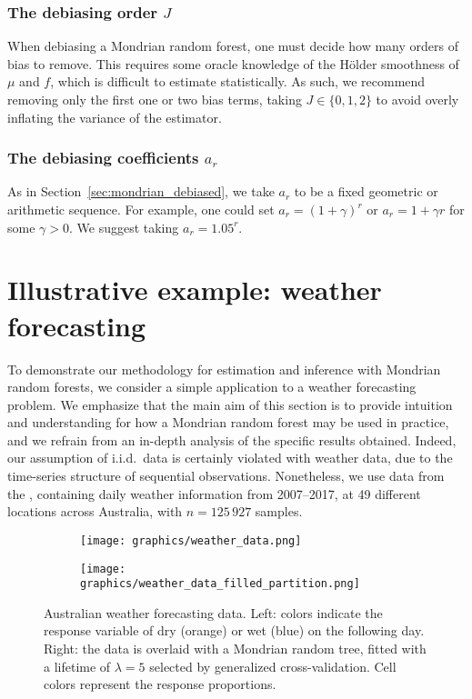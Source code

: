 \documentclass[11pt,lof]{puthesis}
\theoremstyle{break}
\theoremstyle{proof}
\begin{document}
\subsubsection*{The debiasing order \texorpdfstring{$J$}{J}}%

When debiasing a Mondrian random forest, one must decide
how many orders of bias to remove. This requires some
oracle knowledge of the H{\"o}lder smoothness of $\mu$ and $f$, which is
difficult to estimate statistically. As such, we recommend
removing only the first one or two bias terms, taking $J \in \{0,1,2\}$ to
avoid overly inflating the variance of the estimator.

\subsubsection*{The debiasing coefficients \texorpdfstring{$a_r$}{ar}}%

As in Section~\ref{sec:mondrian_debiased}, we take $a_r$ to be a fixed
geometric or arithmetic sequence. For example, one could set
$a_r = (1+\gamma)^r$ or $a_r = 1 + \gamma r$ for some $\gamma > 0$.
We suggest taking $a_r = 1.05^r$.

\section{Illustrative example: weather forecasting}%
\label{sec:mondrian_weather}

To demonstrate our methodology for estimation and inference with Mondrian random
forests, we consider a simple application
to a weather forecasting problem. We emphasize that the main aim of this
section is to provide intuition and understanding for how a Mondrian random
forest may be used in practice, and we refrain from an in-depth analysis of the
specific results obtained. Indeed, our assumption of i.i.d.\ data is
certainly violated with weather data, due to the time-series
structure of sequential observations.
Nonetheless, we use data from the \citet{bureau2017daily}, containing daily
weather information from 2007--2017, at 49 different
locations across Australia, with $n = 125\,927$ samples.

\begin{figure}[b!]
\centering
\begin{subfigure}{0.49\textwidth}
\centering
\texttt{[image: graphics/weather\_data.png]}%
\end{subfigure}
\begin{subfigure}{0.49\textwidth}
\centering
\texttt{[image: graphics/weather\_data\_filled\_partition.png]}%
\end{subfigure}
\caption[Australian weather forecasting data]{
Australian weather forecasting data. Left: colors indicate the response
variable of dry (orange) or wet (blue) on the following
day. Right: the data is overlaid with a Mondrian random tree,
fitted with a lifetime of $\lambda = 5$
selected by generalized cross-validation. Cell colors represent the response
proportions.}
\label{fig:mondrian_weather_data}
\end{figure}
\end{document}
